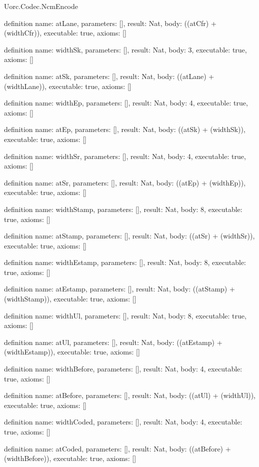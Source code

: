 \begin{lexlean}{Uorc.Codec.NcmEncode}
\begin{semanticmodule}
definition{
  name: atLane,
  parameters: [],
  result: Nat,
  body: ((atCfr) + (widthCfr)),
  executable: true,
  axioms: []
}

definition{
  name: widthSk,
  parameters: [],
  result: Nat,
  body: 3,
  executable: true,
  axioms: []
}

definition{
  name: atSk,
  parameters: [],
  result: Nat,
  body: ((atLane) + (widthLane)),
  executable: true,
  axioms: []
}

definition{
  name: widthEp,
  parameters: [],
  result: Nat,
  body: 4,
  executable: true,
  axioms: []
}

definition{
  name: atEp,
  parameters: [],
  result: Nat,
  body: ((atSk) + (widthSk)),
  executable: true,
  axioms: []
}

definition{
  name: widthSr,
  parameters: [],
  result: Nat,
  body: 4,
  executable: true,
  axioms: []
}

definition{
  name: atSr,
  parameters: [],
  result: Nat,
  body: ((atEp) + (widthEp)),
  executable: true,
  axioms: []
}

definition{
  name: widthStamp,
  parameters: [],
  result: Nat,
  body: 8,
  executable: true,
  axioms: []
}

definition{
  name: atStamp,
  parameters: [],
  result: Nat,
  body: ((atSr) + (widthSr)),
  executable: true,
  axioms: []
}

definition{
  name: widthEstamp,
  parameters: [],
  result: Nat,
  body: 8,
  executable: true,
  axioms: []
}

definition{
  name: atEstamp,
  parameters: [],
  result: Nat,
  body: ((atStamp) + (widthStamp)),
  executable: true,
  axioms: []
}

definition{
  name: widthUl,
  parameters: [],
  result: Nat,
  body: 8,
  executable: true,
  axioms: []
}

definition{
  name: atUl,
  parameters: [],
  result: Nat,
  body: ((atEstamp) + (widthEstamp)),
  executable: true,
  axioms: []
}

definition{
  name: widthBefore,
  parameters: [],
  result: Nat,
  body: 4,
  executable: true,
  axioms: []
}

definition{
  name: atBefore,
  parameters: [],
  result: Nat,
  body: ((atUl) + (widthUl)),
  executable: true,
  axioms: []
}

definition{
  name: widthCoded,
  parameters: [],
  result: Nat,
  body: 4,
  executable: true,
  axioms: []
}

definition{
  name: atCoded,
  parameters: [],
  result: Nat,
  body: ((atBefore) + (widthBefore)),
  executable: true,
  axioms: []
}


\end{semanticmodule}
\end{lexlean}
